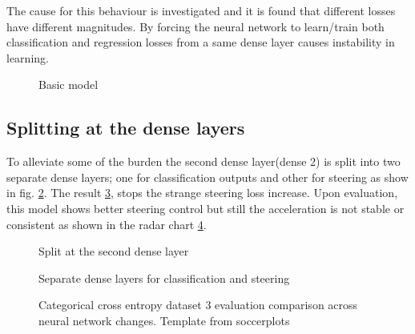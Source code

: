 The cause for this behaviour is investigated and it is found that different losses have
different magnitudes. By forcing the neural network to learn/train both classification and
regression losses from a same dense layer causes instability in learning.
\begin{figure}[t]
	\centering
    \def\svgwidth{\textwidth}
    \caption{Basic model}
    \label{fig:ds3categoricalcrossentropybasic}
\end{figure}
\subsection{Splitting at the dense layers}
To alleviate some of the burden the second dense layer(dense 2) is split into two separate dense
layers; one for classification outputs and other for steering as show in fig. \ref{fig:steeringdensesplit}. The result \ref{fig:ds3categoricalcrossentropydense}, stops
the strange steering loss increase. Upon evaluation, this model shows better steering
control but still the acceleration is not stable or consistent as shown in the radar chart 
\ref{fig:radarccecompare}.
\begin{figure}[!ht]
	\centering
    \def\svgwidth{0.2\textwidth}
    \caption{Split at the second dense layer}
    \label{fig:steeringdensesplit}
\end{figure}

\begin{figure}[!ht]
	\centering
    \def\svgwidth{0.9\textwidth}
    \caption{Separate dense layers for classification and steering}
    \label{fig:ds3categoricalcrossentropydense}
\end{figure}

\begin{figure}[!ht]
    \centering
    \def\svgwidth{\linewidth}
    
    \caption{Categorical cross entropy dataset 3 evaluation comparison across neural
    network changes. Template from soccerplots\cite{soccerplots}}
    \label{fig:radarccecompare}
\end{figure}
